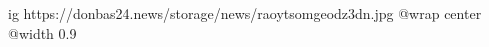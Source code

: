  
 
 
 
 

\ifcmt
  ig https://donbas24.news/storage/news/raoytsomgeodz3dn.jpg
  @wrap center
  @width 0.9
\fi
